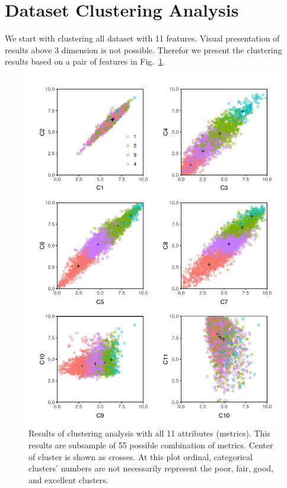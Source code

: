 
\section{Dataset Clustering Analysis}

We start with clustering all dataset with 11 features. Visual presentation of results above 3 dimension is not possible. Therefor we present the clustering results based on a pair of features in Fig.~\ref{fig:CxCy_11}. 

\begin{figure}
    \centering
    \includegraphics[width=\textwidth]{figures/pdf/Figure_5.pdf}
    \caption{Results of clustering analysis with all 11 attributes (metrics). This results are subsample of 55 possible combination of metrics. Center of cluster is shown as crosses. At this plot ordinal, categorical clusters' numbers are not necessarily represent the poor, fair, good, and excellent clusters. }
    \label{fig:CxCy_11}
\end{figure}

